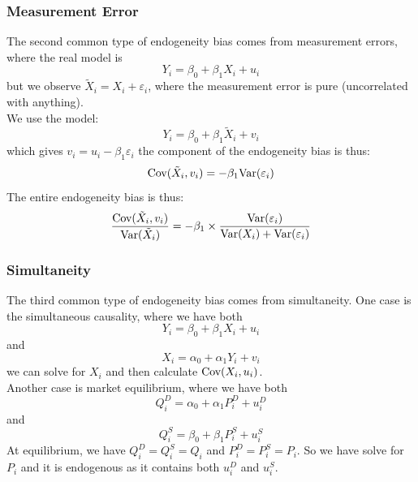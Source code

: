 \subsubsection{Measurement Error}
The second common type of endogeneity bias comes from measurement errors, where the real model is
$$Y_i = \beta_0 + \beta_1 X_i + u_i$$
but we observe $\tilde{X}_i = X_i + \varepsilon_i$, where the measurement error is pure (uncorrelated with anything). \\
We use the model:
$$Y_i = \beta_0 + \beta_1 \tilde{X}_i + v_i$$
which gives $v_i = u_i - \beta_1 \varepsilon_i$
the component of the endogeneity bias is thus:
$$\text{Cov}(\tilde{X}_i, v_i) = -\beta_1 \text{Var}(\varepsilon_i)$$
The entire endogeneity bias is thus:
$$\frac{\text{Cov}(\tilde{X}_i, v_i)}{\text{Var}(\tilde{X}_i)} = -\beta_1 \times \frac{\text{Var}(\varepsilon_i)}{\text{Var}(X_i) + \text{Var}(\varepsilon_i)}$$

\subsubsection{Simultaneity}
The third common type of endogeneity bias comes from simultaneity. One case is the simultaneous causality, where we have both
$$Y_i = \beta_0 + \beta_1 X_i + u_i$$
and
$$X_i = \alpha_0 + \alpha_1 Y_i + v_i$$
we can solve for $X_i$ and then calculate $\text{Cov}(X_i, u_i)$. \\
Another case is market equilibrium, where we have both
$$Q_i^D = \alpha_0 + \alpha_1 P_i^D + u_i^D$$
and
$$Q_i^S = \beta_0 + \beta_1 P_i^S + u_i^S$$
At equilibrium, we have $Q_i^D = Q_i^S = Q_i$ and $P_i^D = P_i^S = P_i$. So we have solve for $P_i$ and it is endogenous as it contains both $u_i^D$ and $u_i^S$.


